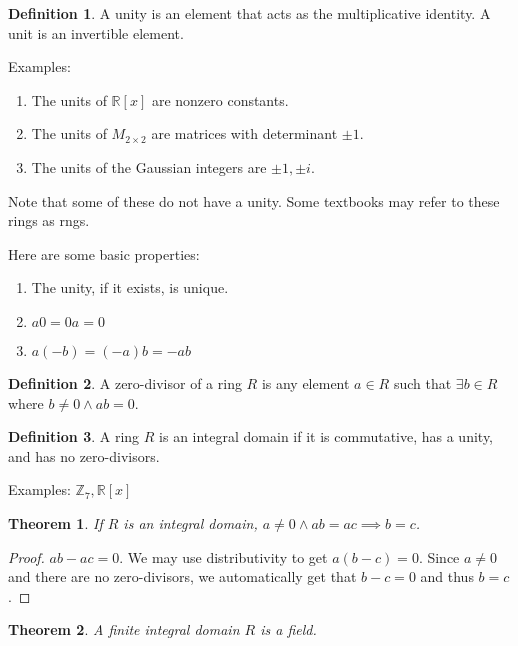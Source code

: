 \documentclass{article}
\theoremstyle{definition}
\newtheorem{definition}{Definition}
\theoremstyle{plain}
\newtheorem{theorem}{Theorem}
\theoremstyle{corollary}
\theoremstyle{lemma}
\begin{document}
\begin{definition}
    A unity is an element that acts as the multiplicative identity. A unit is an invertible element.
\end{definition}

Examples:
\begin{enumerate}
    \item The units of $\mathbb{R}[x]$ are nonzero constants.
    \item The units of $M_{2\times2}$ are matrices with determinant $\pm1$.
    \item The units of the Gaussian integers are $\pm1,\pm i$.
\end{enumerate}

Note that some of these do not have a unity. Some textbooks may refer to these rings as rngs.

Here are some basic properties:
\begin{enumerate}
    \item The unity, if it exists, is unique.
    \item $a0=0a=0$
    \item $a(-b)=(-a)b=-ab$
\end{enumerate}

\begin{definition}
    A zero-divisor of a ring $R$ is any element $a\in R$ such that $\exists b\in R$ where $b\neq0\land ab=0$.
\end{definition}

\begin{definition}
    A ring $R$ is an integral domain if it is commutative, has a unity, and has no zero-divisors.
\end{definition}

Examples: $\mathbb{Z}_7,\mathbb{R}[x]$

\begin{theorem}
    If $R$ is an integral domain, $a\neq0\land ab=ac\implies b=c$.
\end{theorem}

\begin{proof}
    $ab-ac=0$. We may use distributivity to get $a(b-c)=0$. Since $a\neq0$ and there are no zero-divisors, we automatically get that $b-c=0$ and thus $b=c$.
\end{proof}

\begin{theorem}
    A finite integral domain $R$ is a field.
\end{theorem}
\end{document}
